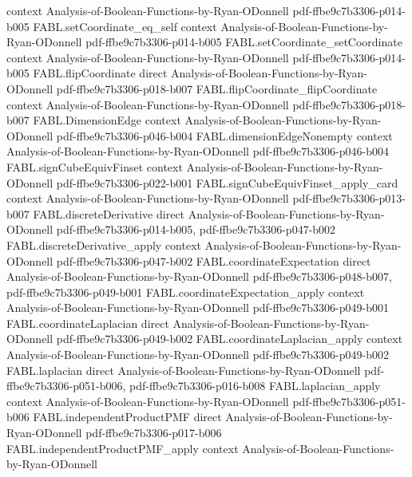 \begin{theorem}
  {context}
  {Analysis-of-Boolean-Functions-by-Ryan-ODonnell}
  {pdf-ffbe9c7b3306-p014-b005}
\proofstep
  {FABL.setCoordinate_eq_self}
  {context}
  {Analysis-of-Boolean-Functions-by-Ryan-ODonnell}
  {pdf-ffbe9c7b3306-p014-b005}
\proofstep
  {FABL.setCoordinate_setCoordinate}
  {context}
  {Analysis-of-Boolean-Functions-by-Ryan-ODonnell}
  {pdf-ffbe9c7b3306-p014-b005}
\proofstep
  {FABL.flipCoordinate}
  {direct}
  {Analysis-of-Boolean-Functions-by-Ryan-ODonnell}
  {pdf-ffbe9c7b3306-p018-b007}
\proofstep
  {FABL.flipCoordinate_flipCoordinate}
  {context}
  {Analysis-of-Boolean-Functions-by-Ryan-ODonnell}
  {pdf-ffbe9c7b3306-p018-b007}
\proofstep
  {FABL.DimensionEdge}
  {context}
  {Analysis-of-Boolean-Functions-by-Ryan-ODonnell}
  {pdf-ffbe9c7b3306-p046-b004}
\proofstep
  {FABL.dimensionEdgeNonempty}
  {context}
  {Analysis-of-Boolean-Functions-by-Ryan-ODonnell}
  {pdf-ffbe9c7b3306-p046-b004}
\proofstep
  {FABL.signCubeEquivFinset}
  {context}
  {Analysis-of-Boolean-Functions-by-Ryan-ODonnell}
  {pdf-ffbe9c7b3306-p022-b001}
\proofstep
  {FABL.signCubeEquivFinset_apply_card}
  {context}
  {Analysis-of-Boolean-Functions-by-Ryan-ODonnell}
  {pdf-ffbe9c7b3306-p013-b007}
\proofstep
  {FABL.discreteDerivative}
  {direct}
  {Analysis-of-Boolean-Functions-by-Ryan-ODonnell}
  {pdf-ffbe9c7b3306-p014-b005,
    pdf-ffbe9c7b3306-p047-b002}
\proofstep
  {FABL.discreteDerivative_apply}
  {context}
  {Analysis-of-Boolean-Functions-by-Ryan-ODonnell}
  {pdf-ffbe9c7b3306-p047-b002}
\proofstep
  {FABL.coordinateExpectation}
  {direct}
  {Analysis-of-Boolean-Functions-by-Ryan-ODonnell}
  {pdf-ffbe9c7b3306-p048-b007,
    pdf-ffbe9c7b3306-p049-b001}
\proofstep
  {FABL.coordinateExpectation_apply}
  {context}
  {Analysis-of-Boolean-Functions-by-Ryan-ODonnell}
  {pdf-ffbe9c7b3306-p049-b001}
\proofstep
  {FABL.coordinateLaplacian}
  {direct}
  {Analysis-of-Boolean-Functions-by-Ryan-ODonnell}
  {pdf-ffbe9c7b3306-p049-b002}
\proofstep
  {FABL.coordinateLaplacian_apply}
  {context}
  {Analysis-of-Boolean-Functions-by-Ryan-ODonnell}
  {pdf-ffbe9c7b3306-p049-b002}
\proofstep
  {FABL.laplacian}
  {direct}
  {Analysis-of-Boolean-Functions-by-Ryan-ODonnell}
  {pdf-ffbe9c7b3306-p051-b006,
    pdf-ffbe9c7b3306-p016-b008}
\proofstep
  {FABL.laplacian_apply}
  {context}
  {Analysis-of-Boolean-Functions-by-Ryan-ODonnell}
  {pdf-ffbe9c7b3306-p051-b006}
\proofstep
  {FABL.independentProductPMF}
  {direct}
  {Analysis-of-Boolean-Functions-by-Ryan-ODonnell}
  {pdf-ffbe9c7b3306-p017-b006}
\proofstep
  {FABL.independentProductPMF_apply}
  {context}
  {Analysis-of-Boolean-Functions-by-Ryan-ODonnell}

\end{theorem}
